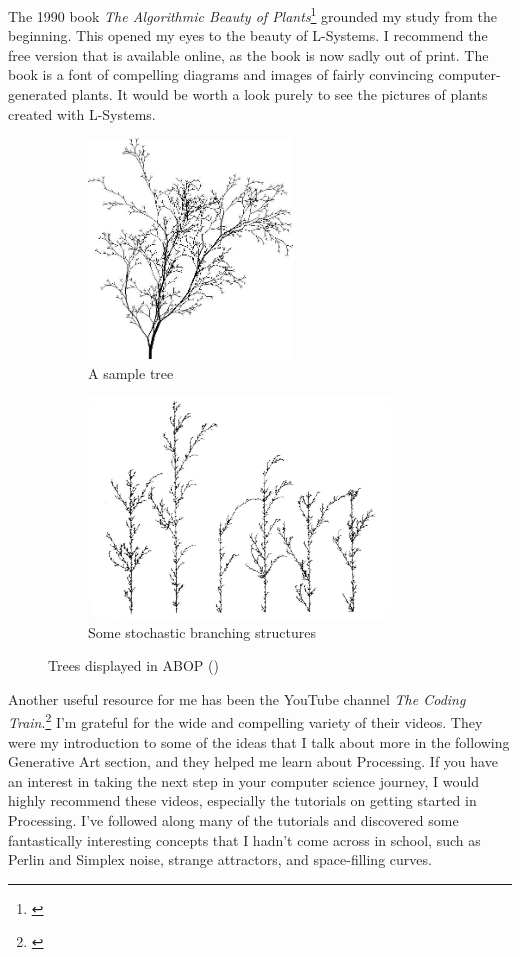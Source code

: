 \documentclass[12pt,twoside]{reedthesis}
\begin{document}
	The 1990 book \textit{The Algorithmic Beauty of Plants}\footnote{\cite{ABOP1990}} grounded my study from the beginning. This opened my eyes to the beauty of L-Systems. I recommend the free version that is available online, as the book is now sadly out of print. The book is a font of compelling diagrams and images of fairly convincing computer-generated plants. It would be worth a look purely to see the pictures of plants created with L-Systems.
	
	\begin{figure}[H]
	\centering
	\begin{subfigure}{0.37\linewidth}
		\centering
		\includegraphics[height=2.3in]{Images/ABOP1}
		\caption{A sample tree}
		\label {ABOP1}
	\end{subfigure}%
	\hfill
	\begin{subfigure}{0.6\linewidth}
		\centering
		\includegraphics[height=2.3in]{Images/ABOP4}
		\caption{Some stochastic branching structures}
		\label {ABOP4}
	\end{subfigure}
	\caption{Trees displayed in ABOP (\cite{ABOP1990})}
	\label{ABOPtrees}
	\end{figure}
	
	Another useful resource for me has been the YouTube channel \textit{The Coding Train}.\footnote{\cite{codingTrain}} I'm grateful for the wide and compelling variety of their videos. They were my introduction to some of the ideas that I talk about more in the following Generative Art section, and they helped me learn about Processing. If you have an interest in taking the next step in your computer science journey, I would highly recommend these videos, especially the tutorials on getting started in Processing. I've followed along many of the tutorials and discovered some fantastically interesting concepts that I hadn't come across in school, such as Perlin and Simplex noise, strange attractors, and space-filling curves.
	
\end{document}
